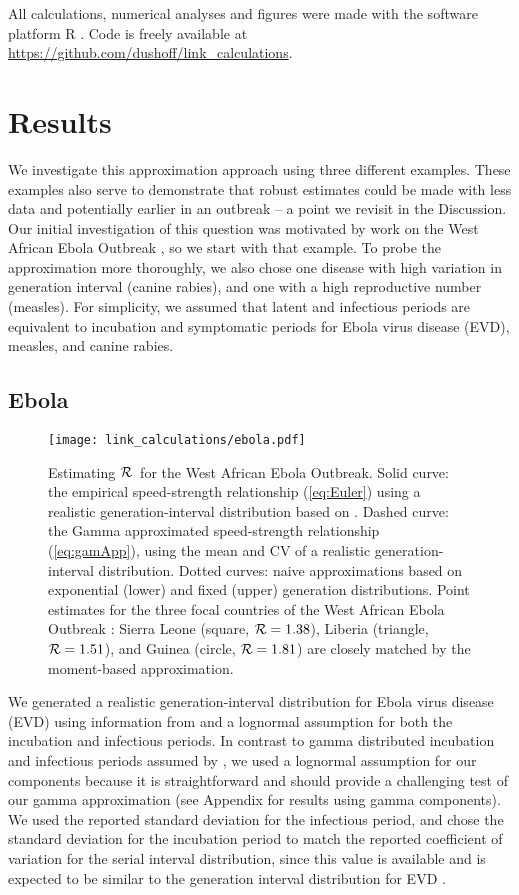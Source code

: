 \documentclass[12pt]{article}
\newcommand{\RR}{\ensuremath{{\cal R}}}
\newcommand{\eref}[1]{(\ref{eq:#1})}
\begin{document}
All calculations, numerical analyses and figures were made with the software platform R \cite{Rproject}. Code is freely available at \url{https://github.com/dushoff/link_calculations}.

\section{Results}\label{Results}

We investigate this approximation approach using three different examples. 
These examples also serve to demonstrate that robust estimates could be made with less data and potentially earlier in an outbreak -- a point we revisit in the Discussion.
Our initial investigation of this question was motivated by work on the West African Ebola Outbreak \cite{WeitDush15}, so we start with that example. To probe the approximation more thoroughly, we also chose one disease with high variation in generation interval (canine rabies), and one with a high reproductive number (measles). For simplicity, we assumed that latent and infectious periods are equivalent to incubation and symptomatic periods for Ebola virus disease (EVD), measles, and canine rabies.


\subsection{Ebola}
\label{EbolaEx}

\begin{figure}[htbp] \centering
	\texttt{[image: link\_calculations/ebola.pdf]}
	\caption{
		Estimating \RR~for the West African Ebola Outbreak.
		Solid curve: the empirical speed-strength relationship \eref{Euler} using a realistic generation-interval distribution based on \cite{AylwBarb14}.
	Dashed curve: the Gamma approximated speed-strength relationship \eref{gamApp}, using the mean and CV of a realistic generation-interval distribution. 
Dotted curves: naive approximations based on exponential (lower) and fixed (upper) generation distributions.
Point estimates for the three focal countries of the West African Ebola Outbreak  \cite{AylwBarb14}: Sierra Leone (square, $\RR=1.38$), Liberia (triangle, $\RR=1.51$), and Guinea (circle, $\RR=1.81$) are closely matched by the moment-based approximation. 
	\label{fig:EbolaCurve}}
\end{figure}

We generated a realistic generation-interval distribution for Ebola virus disease (EVD) using information from \cite{AylwBarb14} and a lognormal assumption for both the incubation and infectious periods.
In contrast to gamma distributed incubation and infectious periods assumed by \cite{AylwBarb14}, we used a lognormal assumption for our components because it is straightforward and should provide a challenging test of our gamma approximation (see Appendix for results using gamma components). 
We used the reported standard deviation for the infectious period, and chose the standard deviation for the incubation period to match the reported coefficient of variation for the serial interval distribution, since this value is available and is expected to be similar to the generation interval distribution for EVD \cite{AylwBarb14}.
\end{document}

